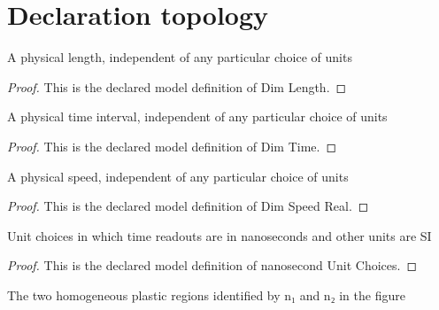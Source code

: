 \section{Declaration topology}
\begin{definition}
  \label{def:physics:phyx-mini-0086:phyxminiproblems-problemphyxmini0086-dimlength}
  A physical length, independent of any particular choice of units
\end{definition}
\begin{proof}
  This is the declared model definition of Dim Length.
\end{proof}
\begin{definition}
  \label{def:physics:phyx-mini-0086:phyxminiproblems-problemphyxmini0086-dimtime}
  A physical time interval, independent of any particular choice of units
\end{definition}
\begin{proof}
  This is the declared model definition of Dim Time.
\end{proof}
\begin{definition}
  \label{def:physics:phyx-mini-0086:phyxminiproblems-problemphyxmini0086-dimspeedreal}
  A physical speed, independent of any particular choice of units
\end{definition}
\begin{proof}
  This is the declared model definition of Dim Speed Real.
\end{proof}
\begin{definition}
  \label{def:physics:phyx-mini-0086:phyxminiproblems-problemphyxmini0086-nanosecondunitchoices}
  Unit choices in which time readouts are in nanoseconds and other units are SI
\end{definition}
\begin{proof}
  This is the declared model definition of nanosecond Unit Choices.
\end{proof}
\begin{definition}
  \label{def:physics:phyx-mini-0086:phyxminiproblems-problemphyxmini0086-opticalfiberregion}
  The two homogeneous plastic regions identified by n₁ and n₂ in the figure
\end{definition}
